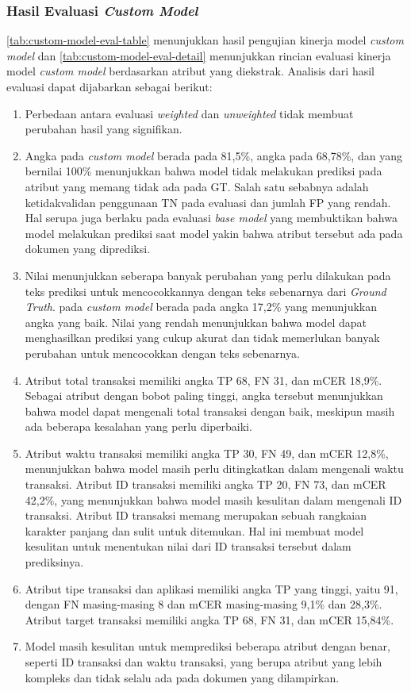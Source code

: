 \subsubsection{Hasil Evaluasi \emph{Custom Model}}
\label{subsubsec:hasil-evaluasi-custom-model}
\autoref{tab:custom-model-eval-table} menunjukkan hasil pengujian kinerja model \emph{custom model} dan \autoref{tab:custom-model-eval-detail} menunjukkan rincian evaluasi kinerja model \emph{custom model} berdasarkan atribut yang diekstrak. Analisis dari hasil evaluasi dapat dijabarkan sebagai berikut:
\begin{enumerate}
    \item Perbedaan antara evaluasi \emph{weighted} dan \emph{unweighted} tidak membuat perubahan hasil yang signifikan.
    \item Angka \fscore{} pada \emph{custom model} berada pada 81,5\%, angka \recall{} pada 68,78\%, dan \precision{} yang bernilai 100\% menunjukkan bahwa model tidak melakukan prediksi pada atribut yang memang tidak ada pada GT. Salah satu sebabnya adalah ketidakvalidan penggunaan TN pada evaluasi dan jumlah FP yang rendah. Hal serupa juga berlaku pada evaluasi \emph{base model} yang membuktikan bahwa model \donut{} melakukan prediksi saat model yakin bahwa atribut tersebut ada pada dokumen yang diprediksi.
    \item Nilai \mcer{} menunjukkan seberapa banyak perubahan yang perlu dilakukan pada teks prediksi untuk mencocokkannya dengan teks sebenarnya dari \emph{Ground Truth}. \mcer{} pada \emph{custom model} berada pada angka 17,2\% yang menunjukkan angka yang baik. Nilai \mcer{} yang rendah menunjukkan bahwa model dapat menghasilkan prediksi yang cukup akurat dan tidak memerlukan banyak perubahan untuk mencocokkan dengan teks sebenarnya.
    \item Atribut total transaksi memiliki angka TP 68, FN 31, dan mCER 18,9\%. Sebagai atribut dengan bobot paling tinggi, angka tersebut menunjukkan bahwa model dapat mengenali total transaksi dengan baik, meskipun masih ada beberapa kesalahan yang perlu diperbaiki.
    \item Atribut waktu transaksi memiliki angka TP 30, FN 49, dan mCER 12,8\%, menunjukkan bahwa model masih perlu ditingkatkan dalam mengenali waktu transaksi. Atribut ID transaksi memiliki angka TP 20, FN 73, dan mCER 42,2\%, yang menunjukkan bahwa model masih kesulitan dalam mengenali ID transaksi. Atribut ID transaksi memang merupakan sebuah rangkaian karakter panjang dan sulit untuk ditemukan. Hal ini membuat model kesulitan untuk menentukan nilai dari ID transaksi tersebut dalam prediksinya.
    \item Atribut tipe transaksi dan aplikasi memiliki angka TP yang tinggi, yaitu 91, dengan FN masing-masing 8 dan mCER masing-masing 9,1\% dan 28,3\%. Atribut target transaksi memiliki angka TP 68, FN 31, dan mCER 15,84\%. 
    \item Model masih kesulitan untuk memprediksi beberapa atribut dengan benar, seperti ID transaksi dan waktu transaksi, yang berupa atribut yang lebih kompleks dan tidak selalu ada pada dokumen yang dilampirkan.
\end{enumerate}
        
